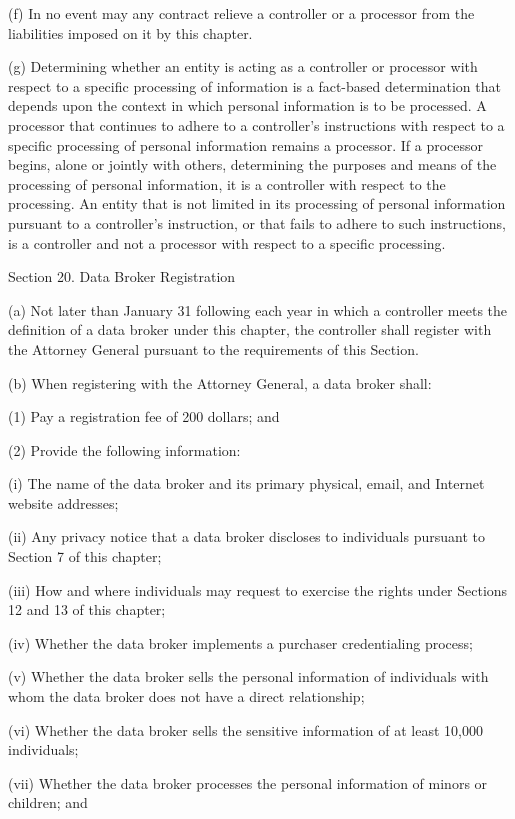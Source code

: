 (f) In no event may any contract relieve a controller or a processor from the liabilities imposed on it by this chapter.

(g) Determining whether an entity is acting as a controller or processor with respect to a specific processing of information is a fact-based determination that depends upon the context in which personal information is to be processed. A processor that continues to adhere to a controller’s instructions with respect to a specific processing of personal information remains a processor. If a processor begins, alone or jointly with others, determining the purposes and means of the processing of personal information, it is a controller with respect to the processing. An entity that is not limited in its processing of personal information pursuant to a controller’s instruction, or that fails to adhere to such instructions, is a controller and not a processor with respect to a specific processing.

Section 20. Data Broker Registration

(a) Not later than January 31 following each year in which a controller meets the definition of a data broker under this chapter, the controller shall register with the Attorney General pursuant to the requirements of this Section.

(b) When registering with the Attorney General, a data broker shall:

(1) Pay a registration fee of 200 dollars; and  

(2) Provide the following information:

(i) The name of the data broker and its primary physical, email, and Internet website addresses;

(ii) Any privacy notice that a data broker discloses to individuals pursuant to Section 7 of this chapter;

(iii) How and where individuals may request to exercise the rights under Sections 12 and 13 of this chapter;

(iv) Whether the data broker implements a purchaser credentialing process;

(v) Whether the data broker sells the personal information of individuals with whom the data broker does not have a direct relationship;

(vi) Whether the data broker sells the sensitive information of at least 10,000 individuals;

(vii) Whether the data broker processes the personal information of minors or children; and 

